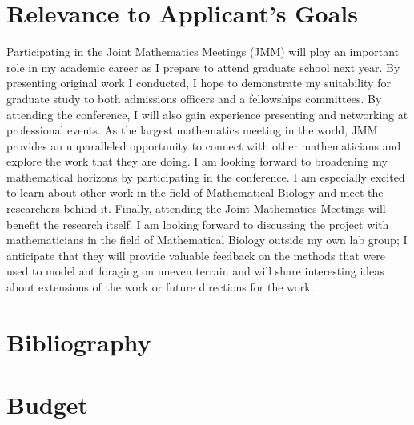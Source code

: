 \documentclass{scrartcl}
\begin{document}
\section{Relevance to Applicant’s Goals}
Participating in the Joint Mathematics Meetings (JMM) will play an important role in my academic career as I prepare to attend graduate school next year. By presenting original work I conducted, I hope to demonstrate my suitability for graduate study to both admissions officers and a fellowships committees. By attending the conference, I will also gain experience presenting and networking at professional events. As the largest mathematics meeting in the world, JMM provides an unparalleled opportunity to connect with other mathematicians and explore the work that they are doing. I am looking forward to broadening my mathematical horizons by participating in the conference. I am especially excited to learn about other work in the field of Mathematical Biology and meet the researchers behind it. Finally, attending the Joint Mathematics Meetings will benefit the research itself. I am looking forward to discussing the project with mathematicians in the field of Mathematical Biology outside my own lab group; I anticipate that they will provide valuable feedback on the methods that were used to model ant foraging on uneven terrain and will share interesting ideas about extensions of the work or future directions for the work.

\section{Bibliography}



\section*{Budget}
\end{document}
